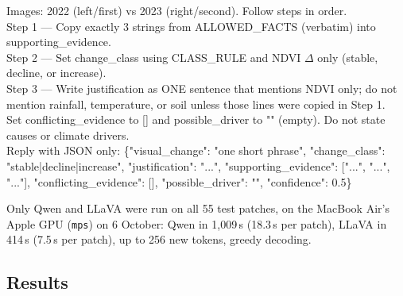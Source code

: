 \begin{tcolorbox}[colback=gray!4,colframe=gray!50,fontupper=\scriptsize]
Images: 2022 (left/first) vs 2023 (right/second). Follow steps in order.\\
Step 1 --- Copy exactly 3 strings from ALLOWED\_FACTS (verbatim) into supporting\_evidence.\\
Step 2 --- Set change\_class using CLASS\_RULE and NDVI $\Delta$ only (stable, decline, or increase).\\
Step 3 --- Write justification as ONE sentence that mentions NDVI only; do not mention rainfall, temperature, or soil unless those lines were copied in Step 1.\\
Set conflicting\_evidence to [] and possible\_driver to "" (empty). Do not state causes or climate drivers.\\
Reply with JSON only: \{"visual\_change": "one short phrase", "change\_class": "stable|decline|increase", "justification": "...", "supporting\_evidence": ["...", "...", "..."], "conflicting\_evidence": [], "possible\_driver": "", "confidence": 0.5\}
\end{tcolorbox}

Only Qwen and LLaVA were run on all 55 test patches, on the MacBook Air's Apple GPU (\texttt{mps}) on 6 October: Qwen in 1,009\,s (18.3\,s per patch), LLaVA in 414\,s (7.5\,s per patch), up to 256 new tokens, greedy decoding.

\subsection{Results}

